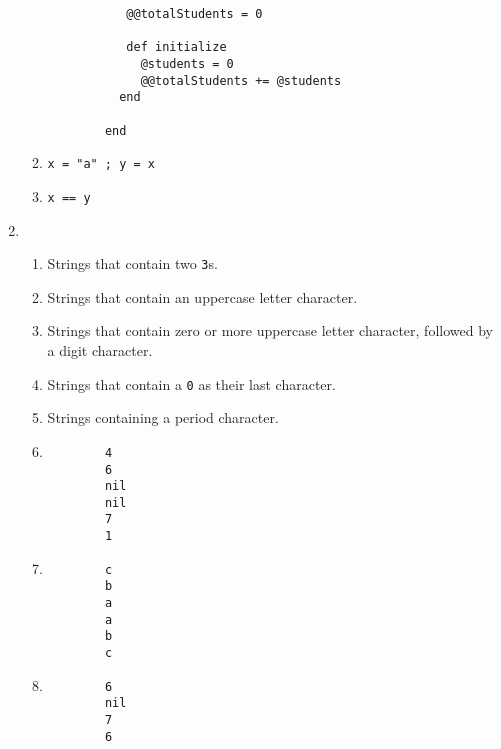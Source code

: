 \documentclass[11pt]{article}
\begin{document}
\begin{enumerate}
\begin{enumerate}
\begin{Verbatim}
           @@totalStudents = 0

           def initialize
             @students = 0
             @@totalStudents += @students
          end

        end
                  \end{Verbatim}

            \item \texttt{x = "a" ; y = x}

            \item \texttt{x == y}

          \end{enumerate}

    \item \begin{enumerate}

            \addtolength{\itemsep}{3mm}

            \item Strings that contain two \texttt{3}s.

            \item Strings that contain an uppercase letter character.

            \item Strings that contain zero or more uppercase letter
                  character, followed by a digit character.

            \item Strings that contain a \texttt{0} as their last character.

            \item Strings containing a period character.

            \item \begin{Verbatim}
        4
        6
        nil
        nil
        7
        1

                  \end{Verbatim}

            \item \begin{Verbatim}
        c
        b
        a
        a
        b
        c

                  \end{Verbatim}

            \item \begin{Verbatim}
        6
        nil
        7
        6

                  \end{Verbatim}


\end{enumerate}
\end{enumerate}
\end{document}

